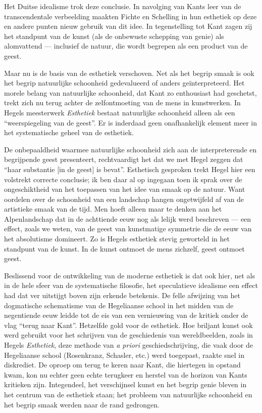Het Duitse idealisme trok deze conclusie. In navolging van Kants leer van de transcendentale verbeelding maakten Fichte en Schelling in hun esthetiek op deze en andere punten nieuw gebruik van dit idee. In tegenstelling tot Kant zagen zij het standpunt van de kunst (als de onbewuste schepping van genie) als alomvattend — inclusief de natuur, die wordt begrepen als een product van de geest.

Maar nu is de basis van de esthetiek verschoven. Net als het begrip smaak is ook het begrip natuurlijke schoonheid gedevalueerd of anders geïnterpreteerd. Het morele belang van natuurlijke schoonheid, dat Kant zo enthousiast had geschetst, trekt zich nu terug achter de zelfontmoeting van de mens in kunstwerken. In Hegels meesterwerk \textit{Esthetiek} bestaat natuurlijke schoonheid alleen als een ``weerspiegeling van de geest''. Er is inderdaad geen onafhankelijk element meer in het systematische geheel van de esthetiek.

De onbepaaldheid waarmee natuurlijke schoonheid zich aan de interpreterende en begrijpende geest presenteert, rechtvaardigt het dat we met Hegel zeggen dat ``haar substantie [in de geest] is bevat''. Esthetisch gesproken trekt Hegel hier een volstrekt correcte conclusie; ik ben daar al op ingegaan toen ik sprak over de ongeschiktheid van het toepassen van het idee van smaak op de natuur. Want oordelen over de schoonheid van een landschap hangen ongetwijfeld af van de artistieke smaak van de tijd. Men hoeft alleen maar te denken aan het Alpenlandschap dat in de achttiende eeuw nog als lelijk werd beschreven — een effect, zoals we weten, van de geest van kunstmatige symmetrie die de eeuw van het absolutisme domineert. Zo is Hegels esthetiek stevig geworteld in het standpunt van de kunst. In de kunst ontmoet de mens zichzelf, geest ontmoet geest.

Beslissend voor de ontwikkeling van de moderne esthetiek is dat ook hier, net als in de hele sfeer van de systematische filosofie, het speculatieve idealisme een effect had dat ver uitstijgt boven zijn erkende betekenis. De felle afwijzing van het dogmatische schematisme van de Hegeliaanse school in het midden van de negentiende eeuw leidde tot de eis van een vernieuwing van de kritiek onder de vlag ``terug naar Kant''. Hetzelfde gold voor de esthetiek. Hoe briljant kunst ook werd gebruikt voor het schrijven van de geschiedenis van wereldbeelden, zoals in Hegels \textit{Esthetiek}, deze methode van \textit{a priori} geschiedschrijving, die vaak door de Hegeliaanse school (Rosenkranz, Schasler, etc.) werd toegepast, raakte snel in diskrediet. De oproep om terug te keren naar Kant, die hiertegen in opstand kwam, kon nu echter geen echte terugkeer en herstel van de horizon van Kants kritieken zijn. Integendeel, het verschijnsel kunst en het begrip genie bleven in het centrum van de esthetiek staan; het probleem van natuurlijke schoonheid en het begrip smaak werden naar de rand gedrongen.

